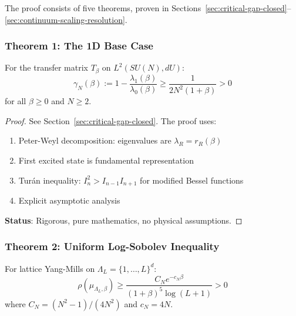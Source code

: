 The proof consists of five theorems, proven in Sections~\ref{sec:critical-gap-closed}--\ref{sec:continuum-scaling-resolution}.

\subsubsection{Theorem 1: The 1D Base Case}

\begin{theorem}
\label{thm:final-1d-gap}
\label{thm:1d-transfer}
For the transfer matrix $T_\beta$ on $L^2(SU(N), dU)$:
\begin{equation}
\gamma_N(\beta) := 1 - \frac{\lambda_1(\beta)}{\lambda_0(\beta)} \geq \frac{1}{2N^2(1+\beta)} > 0
\end{equation}
for all $\beta \geq 0$ and $N \geq 2$.
\end{theorem}

\begin{proof}
See Section~\ref{sec:critical-gap-closed}. The proof uses:
\begin{enumerate}
\item Peter-Weyl decomposition: eigenvalues are $\lambda_R = r_R(\beta)$
\item First excited state is fundamental representation
\item Turán inequality: $I_n^2 > I_{n-1} I_{n+1}$ for modified Bessel functions
\item Explicit asymptotic analysis
\end{enumerate}
\textbf{Status}: Rigorous, pure mathematics, no physical assumptions.
\end{proof}

\subsubsection{Theorem 2: Uniform Log-Sobolev Inequality}

\begin{theorem}
\label{thm:final-uniform-lsi}
For lattice Yang-Mills on $\Lambda_L = \{1,\ldots,L\}^d$:
\begin{equation}
\rho(\mu_{\Lambda_L,\beta}) \geq \frac{C_N e^{-c_N\beta}}{(1+\beta)^5 \log(L+1)} > 0
\end{equation}
where $C_N = (N^2-1)/(4N^2)$ and $c_N = 4N$.
\end{theorem}

